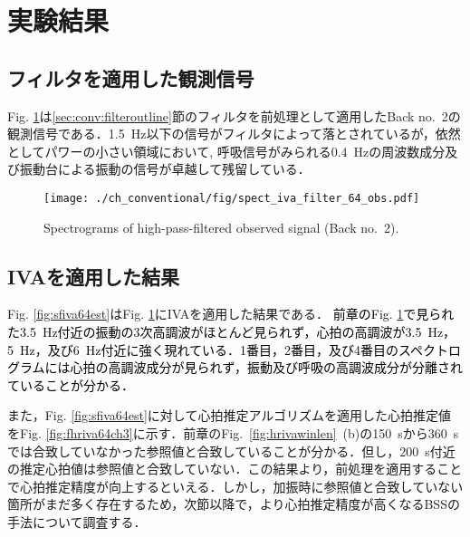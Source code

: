 \section{実験結果}
\label{sec:conv:expresult5}

\subsection{フィルタを適用した観測信号}
\label{sec:conv:resultiva}
Fig. \ref{fig:sfiva64obs}は\ref{sec:conv:filteroutline}節のフィルタを前処理として適用したBack no.~2の観測信号である．1.5~Hz以下の信号がフィルタによって落とされているが，依然としてパワーの小さい領域において, 呼吸信号がみられる0.4~Hzの周波数成分及び振動台による振動の信号が卓越して残留している．

\begin{figure}[tb]
\centering
\texttt{[image: ./ch\_conventional/fig/spect\_iva\_filter\_64\_obs.pdf]}
\caption{Spectrograms of high-pass-filtered observed signal (Back no.~2).}
\label{fig:sfiva64obs}
\end{figure}

\subsection{IVAを適用した結果}
\label{sec:conv:resultiva}
Fig. \ref{fig:sfiva64est}はFig. \ref{fig:sfiva64obs}にIVAを適用した結果である．
\textcolor{black}{前章のFig. \ref{fig:sfiva64obs}で見られた3.5~Hz付近の振動の3次高調波がほとんど見られず，心拍の高調波が3.5~Hz，5~Hz，及び6~Hz付近に強く現れている．1番目，2番目，及び4番目のスペクトログラムには心拍の高調波成分が見られず，振動及び呼吸の高調波成分が分離されていることが分かる．}

また，Fig. \ref{fig:sfiva64est}に対して心拍推定アルゴリズムを適用した心拍推定値をFig. \ref{fig:fhriva64ch3}に示す．前章のFig.~\ref{fig:hrivawinlen}~(b)の150~sから360~sでは合致していなかった参照値と合致していることが分かる．但し，200~s付近の推定心拍値は参照値と合致していない．この結果より，前処理を適用することで心拍推定精度が向上するといえる．しかし，加振時に参照値と合致していない箇所がまだ多く存在するため，次節以降で，より心拍推定精度が高くなるBSSの手法について調査する．

